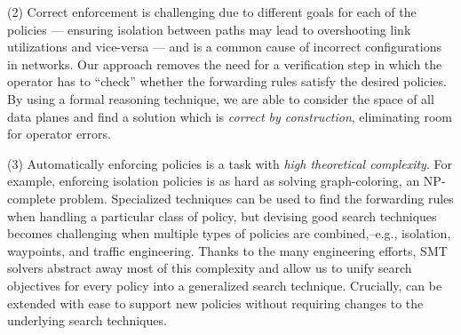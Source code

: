 

(2) Correct enforcement is challenging due to different goals for each
of the policies --- ensuring isolation between paths may
lead to overshooting link utilizations and vice-versa --- and is a
common cause of incorrect configurations in networks.  Our approach
removes the need for a verification step in which the operator has to
``check'' whether the forwarding rules satisfy the desired
policies.  By using a formal reasoning technique, we are
able to consider the space of all data planes and find a solution
which is \emph{correct by construction}, eliminating room for operator
errors.


(3) Automatically enforcing policies is a task with
\emph{high theoretical complexity}.  For example, enforcing isolation
policies is as hard as solving graph-coloring, an 
NP-complete problem.  Specialized techniques can be used to find the
forwarding rules when handling a particular class of policy, but 
 devising good search techniques becomes
 challenging when 
multiple types of policies are combined,--e.g., isolation, waypoints,
and traffic engineering.  Thanks to the many engineering efforts, SMT solvers
abstract away most of this complexity and allow us to unify search
objectives for every policy into a generalized search technique.
Crucially, \Name can be extended with ease to support new policies  without requiring changes to the underlying search
techniques.

